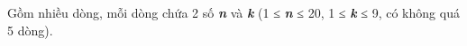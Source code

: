 Gồm nhiều dòng, mỗi dòng chứa 2 số   \textbf{\emph{     n    }}   và   \textbf{\emph{     k    }}   (1 ≤   \textbf{\emph{     n    }}   ≤ 20, 1 ≤   \textbf{\emph{     k    }}   ≤ 9, có không quá 5 dòng).  

\